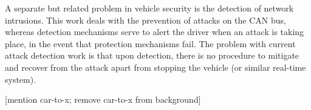 A separate but related problem in vehicle security is the detection of network intrusions. This work deals with the prevention of attacks on the CAN bus, whereas detection mechanisms serve to alert the driver when an attack is taking place, in the event that protection mechanisms fail. The problem with current attack detection work is that upon detection, there is no procedure to mitigate and recover from the attack apart from stopping the vehicle (or similar real-time system).

[mention car-to-x;  remove car-to-x from background]

